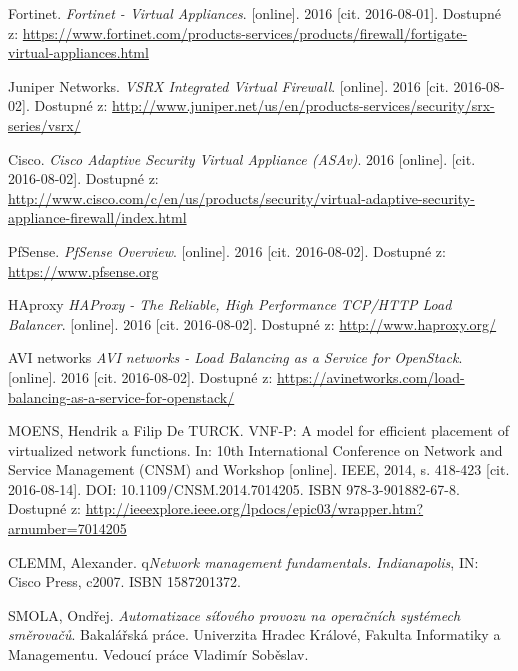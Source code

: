 \begin{thebibliography}{10}
Fortinet. \emph{Fortinet - Virtual Appliances}. [online]. 2016 [cit. 2016-08-01]. Dostupné z: \url{https://www.fortinet.com/products-services/products/firewall/fortigate-virtual-appliances.html}

Juniper Networks. \emph{VSRX Integrated Virtual Firewall}.  [online]. 2016 [cit. 2016-08-02]. Dostupné z: \url{http://www.juniper.net/us/en/products-services/security/srx-series/vsrx/}

 Cisco. \emph{Cisco Adaptive Security Virtual Appliance (ASAv)}. 2016 [online]. [cit. 2016-08-02]. Dostupné z: \url{http://www.cisco.com/c/en/us/products/security/virtual-adaptive-security-appliance-firewall/index.html}

 PfSense. \emph{PfSense Overview}. [online]. 2016 [cit. 2016-08-02]. Dostupné z: \url{https://www.pfsense.org}

 HAproxy \emph{HAProxy - The Reliable, High Performance TCP/HTTP Load Balancer}. [online]. 2016 [cit. 2016-08-02]. Dostupné z: \url{http://www.haproxy.org/}

 AVI networks \emph{AVI networks - Load Balancing as a Service for OpenStack}. [online]. 2016 [cit. 2016-08-02]. Dostupné z: \url{https://avinetworks.com/load-balancing-as-a-service-for-openstack/}

MOENS, Hendrik a Filip De TURCK. VNF-P: A model for efficient placement of virtualized network functions. In: 10th International Conference on Network and Service Management (CNSM) and Workshop [online]. IEEE, 2014, s. 418-423 [cit. 2016-08-14]. DOI: 10.1109/CNSM.2014.7014205. ISBN 978-3-901882-67-8. Dostupné z: \url{http://ieeexplore.ieee.org/lpdocs/epic03/wrapper.htm?arnumber=7014205}

 CLEMM, Alexander. q\emph{Network management fundamentals. Indianapolis}, IN: Cisco Press, c2007. ISBN 1587201372.

 SMOLA, Ondřej. \emph{Automatizace síťového provozu na operačních systémech směrovačů}. Bakalářská práce. Univerzita Hradec Králové, Fakulta Informatiky a Managementu. Vedoucí práce Vladimír Soběslav. 

\end{thebibliography}